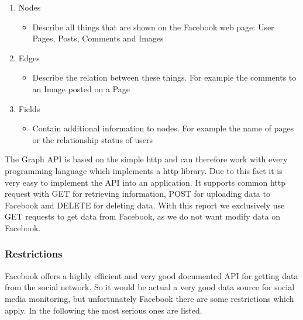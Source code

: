 \documentclass[11pt,titlepage,oneside,openany]{book}
\begin{document}
\begin{enumerate}
   \item Nodes
   \begin{itemize}
     \item Describe all things that are shown on the Facebook web page: User Pages, Posts, Comments and Images
   \end{itemize}
   \item Edges
   \begin{itemize}
     \item Describe the relation between these things. For example the comments to an Image posted on a Page
   \end{itemize}
   \item Fields
   \begin{itemize}
     \item Contain additional information to nodes. For example the name of pages or the relationship status of users
   \end{itemize}
\end{enumerate}

\noindent The Graph API is based on the simple \acrfull{http} and can therefore work with every programming language which implements a \acrshort{http} library. Due to this fact it is very easy to implement the API into an application. It supports common \acrshort{http} request with GET for retrieving information, POST for uploading data to Facebook and DELETE for deleting data. With this report we exclusively use GET requests to get data from Facebook, as we do not want modify data on Facebook. 


\subsubsection{Restrictions}
\label{subsub:fbrestrictions}

Facebook offers a highly efficient and very good documented API for getting data from the social network. So it would be actual a very good data source for social media monitoring, but unfortunately Facebook there are some restrictions which apply. In the following the most serious ones are listed.
\end{document}

